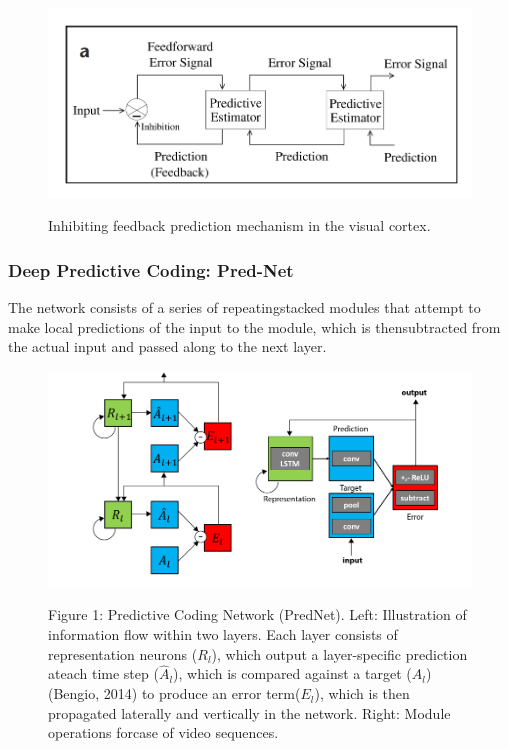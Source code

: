 \documentclass[main]{subfiles}
\begin{document}
 \begin{figure}[H]
	\centering
	\includegraphics[width=0.9\linewidth]{07_UnsupervisedAndSelfsupervisedLearning/figures/pred-coding-overview.png}
	\label{fig:pred-coding-overview}
	\caption{Inhibiting feedback prediction mechanism in the visual cortex.}
\end{figure}

\subsubsection{Deep Predictive Coding: Pred-Net}
The network consists of a series of repeatingstacked modules that attempt to make local predictions of the input to the module, which is thensubtracted from the actual input and passed along to the next layer. 

 \begin{figure}[H]
	\centering
	\includegraphics[width=0.9\linewidth]{07_UnsupervisedAndSelfsupervisedLearning/figures/pred-net.png}
	\label{fig:pred-net}
	\caption{Figure 1:  Predictive Coding Network (PredNet).  Left:  Illustration of information flow within two layers. Each layer consists of representation neurons ($R_l$), which output a layer-specific prediction ateach time step ($\hat{A}_l$), which is compared against a target ($A_l$) (Bengio, 2014) to produce an error term($E_l$), which is then propagated laterally and vertically in the network. Right: Module operations forcase of video sequences.}
\end{figure}
\end{document}
